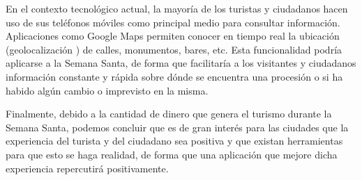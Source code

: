 En el contexto tecnológico actual, la mayoría de los turistas y ciudadanos hacen uso de sus teléfonos móviles como principal medio para consultar información. Aplicaciones como Google Maps \cite{googlemapsapi} permiten conocer en tiempo real la ubicación (geolocalización \cite{geolocalizacion}) de calles, monumentos, bares, etc. Esta funcionalidad podría aplicarse a la Semana Santa, de forma que facilitaría a los visitantes y ciudadanos información constante y rápida sobre dónde se encuentra una procesión o si ha habido algún cambio o imprevisto en la misma.

Finalmente, debido a la cantidad de dinero que genera el turismo durante la Semana Santa, podemos concluir que es de gran interés para las ciudades que la experiencia del turista y del ciudadano sea positiva y que existan herramientas para que esto se haga realidad, de forma que una aplicación que mejore dicha experiencia repercutirá positivamente.
